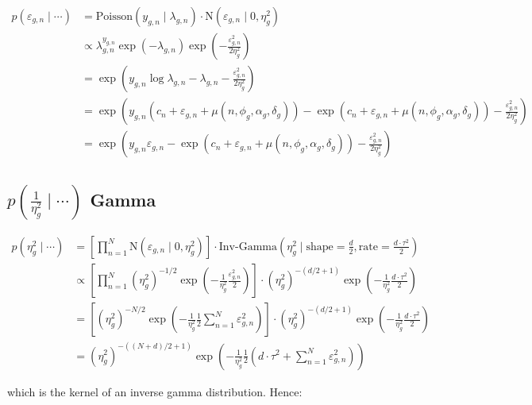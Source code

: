 \documentclass{article}\usepackage{graphicx, color}
\providecommand{\e}{\varepsilon}
\begin{document}
\begin{flushleft}
 \begin{align*}
p(\e_{g, n} \mid \cdots) &= \text{Poisson}(y_{g, n} \mid \lambda_{g, n}) \cdot \text{N}(\e_{g, n} \mid 0, \eta_g^2) \\
&\propto \lambda_{g, n}^{y_{g, n}} \exp(- \lambda_{g,n}) \exp \left ( - \frac{\e_{g, n}^2}{2 \eta_g^2} \right ) \\
&= \exp \left (y_{g, n} \log \lambda_{g, n}- \lambda_{g,n}  - \frac{\e_{g, n}^2}{2 \eta_g^2} \right) \\
&= \exp \left (y_{g, n} (c_n + \e_{g, n} + \mu(n, \phi_g, \alpha_g, \delta_g))- \exp(c_n + \e_{g, n} + \mu(n, \phi_g, \alpha_g, \delta_g))  - \frac{\e_{g, n}^2}{2 \eta_g^2} \right) \\
&= \exp \left (y_{g, n} \e_{g, n} - \exp(c_n + \e_{g, n} + \mu(n, \phi_g, \alpha_g, \delta_g))  - \frac{\e_{g, n}^2}{2 \eta_g^2} \right)
\end{align*}










\subsection{$p \left (\frac{1}{\eta_g^2} \mid \cdots \right )$ Gamma}

\begin{align*}
p(\eta_g^2 \mid \cdots) &= \left [ \prod_{n = 1}^N \text{N}(\e_{g, n} \mid 0, \eta_g^2) \right ] \cdot \text{Inv-Gamma} \left ( \eta_g^2 \mid \text{shape} = \frac{d }{2}, \text{rate} = \frac{d \cdot \tau^2}{2} \right ) \\ 
&\propto \left [ \prod_{n = 1}^N (\eta_g^{2})^{-1/2} \exp \left (- \frac{1}{ \eta_g^2} \frac{\e_{g, n}^2}{2} \right ) \right ] \cdot \left ( { \eta_g^2} \right )^{ -(d/2 + 1)} \exp \left (- \frac{1}{ \eta_g^2}\frac{d \cdot \tau^2}{2} \right ) \\
&=  \left [ (\eta_g^{2})^{-N/2} \exp \left (-\frac{1}{ \eta_g^2}  \frac{1}{2} \sum_{n = 1}^N \e_{g, n}^2 \right ) \right ] \cdot \left ( { \eta_g^2} \right )^{ -(d/2 + 1)} \exp \left (- \frac{1}{ \eta_g^2}\frac{d \cdot \tau^2}{2} \right ) \\
&=  (\eta_g^{2})^{-((N+d)/2 + 1)} \exp \left (-\frac{1}{ \eta_g^2}  \frac{1}{2} \left ( d \cdot \tau^2 + \sum_{n = 1}^N \e_{g, n}^2 \right ) \right ) 
\end{align*}

which is the kernel of an inverse gamma distribution. Hence:


\end{flushleft}
\end{document}
